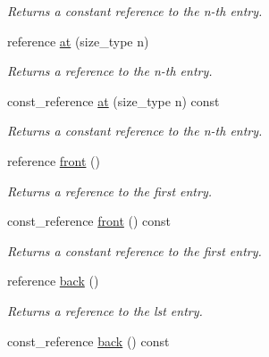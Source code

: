\begin{DoxyCompactItemize}
\begin{DoxyCompactList}\small\item\em Returns a constant reference to the n-\/th entry. \end{DoxyCompactList}\item 
reference \hyperlink{a00559_af3389997a9843ef03f8b1f9d2be674b5}{at} (size\-\_\-type n)
\begin{DoxyCompactList}\small\item\em Returns a reference to the n-\/th entry. \end{DoxyCompactList}\item 
const\-\_\-reference \hyperlink{a00559_a8e2c25545b1379875c87c61d52bc4d31}{at} (size\-\_\-type n) const 
\begin{DoxyCompactList}\small\item\em Returns a constant reference to the n-\/th entry. \end{DoxyCompactList}\item 
\hypertarget{a00559_a478eb5b6f20b49cfc1ce35090af5f6f7}{reference \hyperlink{a00559_a478eb5b6f20b49cfc1ce35090af5f6f7}{front} ()}\label{a00559_a478eb5b6f20b49cfc1ce35090af5f6f7}

\begin{DoxyCompactList}\small\item\em Returns a reference to the first entry. \end{DoxyCompactList}\item 
\hypertarget{a00559_a832d061d88d5c160f67c69c36634bfb7}{const\-\_\-reference \hyperlink{a00559_a832d061d88d5c160f67c69c36634bfb7}{front} () const }\label{a00559_a832d061d88d5c160f67c69c36634bfb7}

\begin{DoxyCompactList}\small\item\em Returns a constant reference to the first entry. \end{DoxyCompactList}\item 
\hypertarget{a00559_a045e120f08a6e2345e0114c4a13fff00}{reference \hyperlink{a00559_a045e120f08a6e2345e0114c4a13fff00}{back} ()}\label{a00559_a045e120f08a6e2345e0114c4a13fff00}

\begin{DoxyCompactList}\small\item\em Returns a reference to the lst entry. \end{DoxyCompactList}\item 
\hypertarget{a00559_a172967531abc4d058413518991a9bf5e}{const\-\_\-reference \hyperlink{a00559_a172967531abc4d058413518991a9bf5e}{back} () const }\label{a00559_a172967531abc4d058413518991a9bf5e}


\end{DoxyCompactItemize}
